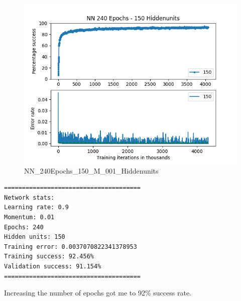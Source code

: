 \documentclass[11pt]{article}
\makeatletter
\def\maxwidth{\ifdim\Gin@nat@width>\linewidth\linewidth
    \else\Gin@nat@width\fi}
\let\Oldincludegraphics\includegraphics
\renewcommand{\includegraphics}[1]{\Oldincludegraphics[width=.8\maxwidth]{#1}}
\makeatother
\begin{document}
\begin{figure}
\centering
\includegraphics{NN_240Epochs_150_M_001_Hiddenunits.png}
\caption{NN\_240Epochs\_150\_M\_001\_Hiddenunits}
\end{figure}

\begin{verbatim}
======================================
Network stats: 
Learning rate: 0.9
Momentum: 0.01
Epochs: 240
Hidden units: 150
Training error: 0.0037070822341378953
Training success: 92.456%
Validation success: 91.154%
======================================
\end{verbatim}

Increasing the number of epochs got me to 92\% success rate.


    
    
    
    
\end{document}
